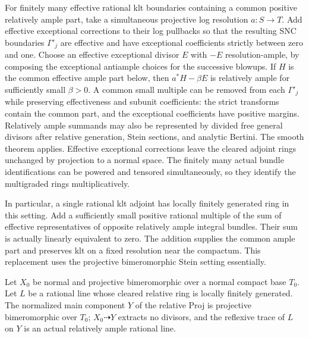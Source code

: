 For finitely many effective rational klt boundaries containing a
common positive relatively ample part, take a simultaneous projective
log resolution $a:S\to T$.  Add effective exceptional corrections to
their log pullbacks so that the resulting SNC boundaries
$\Gamma'_j$ are effective and have exceptional coefficients strictly
between zero and one.  Choose an effective exceptional divisor $E$
with $-E$ resolution-ample, by composing the exceptional antiample
choices for the successive blowups.  If $H$ is the common effective
ample part below, then $a^*H-\beta E$ is relatively ample for sufficiently
small $\beta>0$.  A common small multiple can be removed from each
$\Gamma'_j$ while preserving effectiveness and subunit coefficients:
the strict transforms contain the common part, and the exceptional
coefficients have positive margins.  Relatively ample summands may
also be represented by divided free general divisors after relative
generation, Stein sections, and analytic Bertini.  The smooth theorem
applies.  Effective exceptional corrections leave the cleared adjoint
rings unchanged by projection to a normal space.  The finitely many
actual bundle identifications can be powered and tensored
simultaneously, so they identify the multigraded rings multiplicatively.

In particular, a single rational klt adjoint has locally finitely
generated ring in this setting.  Add a sufficiently small positive
rational multiple of the sum of effective representatives of opposite
relatively ample integral bundles.  Their sum is actually linearly
equivalent to zero.  The addition supplies the common ample part and
preserves klt on a fixed resolution near the compactum.  This
replacement uses the projective bimeromorphic Stein setting
essentially.

\begin{lemma}
\label{bir:proj-nonextraction}
Let $X_0$ be normal and projective bimeromorphic over a normal compact
base $T_0$.  Let $L$ be a rational line whose cleared relative ring is
locally finitely generated.  The normalized main component $Y$ of the
relative Proj is projective bimeromorphic over $T_0$;
$X_0\dashrightarrow Y$ extracts no divisors, and the reflexive trace
of $L$ on $Y$ is an actual relatively ample rational line.
\end{lemma}

